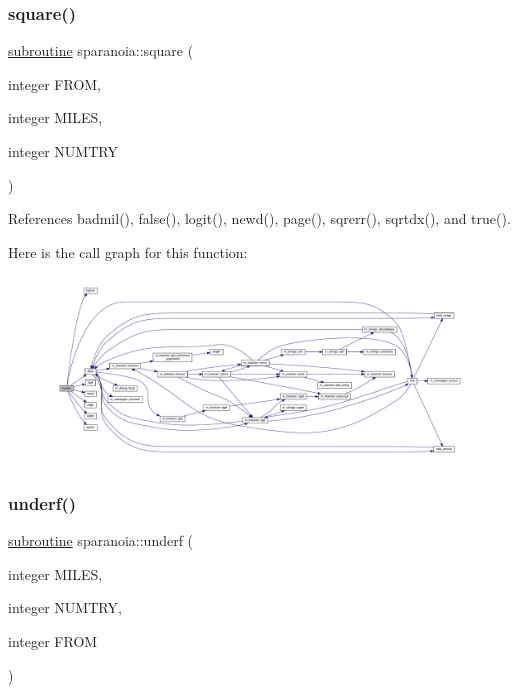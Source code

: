 \mbox{\label{sparanoia_8f90_a12b0d14b130071ecf4cd010e35b092c7}} 
\subsubsection{\texorpdfstring{square()}{square()}}
{\footnotesize\ttfamily \hyperlink{M__stopwatch_83_8txt_acfbcff50169d691ff02d4a123ed70482}{subroutine} sparanoia\+::square (\begin{DoxyParamCaption}\item[{integer}]{F\+R\+OM,  }\item[{integer}]{M\+I\+L\+ES,  }\item[{integer}]{N\+U\+M\+T\+RY }\end{DoxyParamCaption})}



References badmil(), false(), logit(), newd(), page(), sqrerr(), sqrtdx(), and true().

Here is the call graph for this function\+:
\nopagebreak
\begin{figure}[H]
\begin{center}
\leavevmode
\includegraphics[width=350pt]{sparanoia_8f90_a12b0d14b130071ecf4cd010e35b092c7_cgraph}
\end{center}
\end{figure}
\mbox{\label{sparanoia_8f90_a147b84087576e0dcdf30b8e154e1422b}} 
\subsubsection{\texorpdfstring{underf()}{underf()}}
{\footnotesize\ttfamily \hyperlink{M__stopwatch_83_8txt_acfbcff50169d691ff02d4a123ed70482}{subroutine} sparanoia\+::underf (\begin{DoxyParamCaption}\item[{integer}]{M\+I\+L\+ES,  }\item[{integer}]{N\+U\+M\+T\+RY,  }\item[{integer}]{F\+R\+OM }\end{DoxyParamCaption})}



